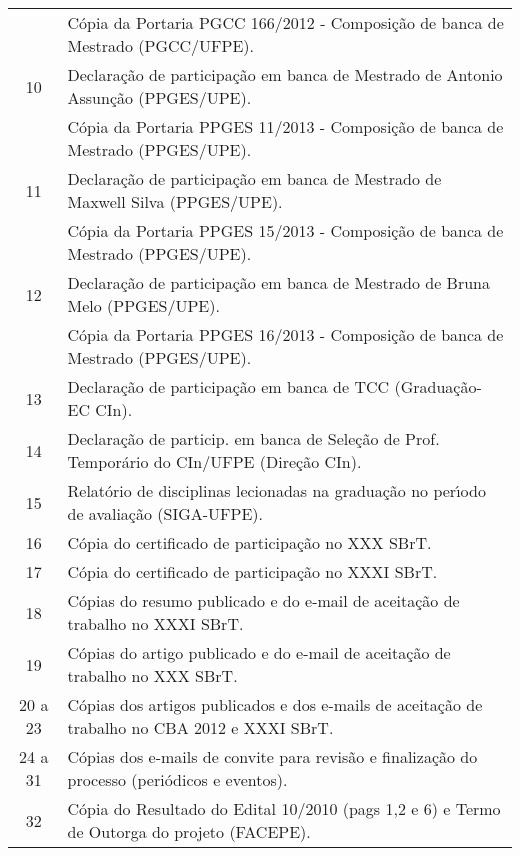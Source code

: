 \documentclass[a4paper,oneside,10pt]{article}
\begin{document}
\begin{table}[h]
\begin{tabular}{cl}
    & C\'{o}pia da Portaria PGCC 166/2012 - Composi\c{c}\~{a}o de banca de Mestrado (PGCC/UFPE). \\
  \cmidrule{1-2}
  10 & Declara\c{c}\~{a}o de participa\c{c}\~{a}o em banca de Mestrado de Antonio Assun\c{c}\~{a}o (PPGES/UPE). \\
     & C\'{o}pia da Portaria PPGES 11/2013 - Composi\c{c}\~{a}o de banca de Mestrado (PPGES/UPE). \\
  \cmidrule{1-2}
  11 & Declara\c{c}\~{a}o de participa\c{c}\~{a}o em banca de Mestrado de Maxwell Silva (PPGES/UPE). \\
     & C\'{o}pia da Portaria PPGES 15/2013 - Composi\c{c}\~{a}o de banca de Mestrado (PPGES/UPE). \\
  \cmidrule{1-2}
  12 & Declara\c{c}\~{a}o de participa\c{c}\~{a}o em banca de Mestrado de Bruna Melo (PPGES/UPE). \\
     & C\'{o}pia da Portaria PPGES 16/2013 - Composi\c{c}\~{a}o de banca de Mestrado (PPGES/UPE). \\
  \cmidrule{1-2}
  13 & Declara\c{c}\~{a}o de participa\c{c}\~{a}o em banca de TCC (Gradua\c{c}\~{a}o-EC CIn). \\
  14 & Declara\c{c}\~{a}o de particip. em banca de Sele\c{c}\~{a}o de Prof. Tempor\'{a}rio do CIn/UFPE (Dire\c{c}\~{a}o CIn). \\
  15 & Relat\'{o}rio de disciplinas lecionadas na gradua\c{c}\~{a}o no per\'{\i}odo de avalia\c{c}\~{a}o (SIGA-UFPE).\\
  16 & C\'{o}pia do certificado de participa\c{c}\~{a}o no XXX SBrT. \\
  17 & C\'{o}pia do certificado de participa\c{c}\~{a}o no XXXI SBrT. \\
  18 & C\'{o}pias do resumo publicado e do e-mail de aceita\c{c}\~{a}o de trabalho no XXXI SBrT. \\
  19 & C\'{o}pias do artigo publicado e do e-mail de aceita\c{c}\~{a}o de trabalho no XXX SBrT. \\
  20 a 23 & C\'{o}pias dos artigos publicados e dos e-mails de aceita\c{c}\~{a}o de trabalho no CBA 2012 e XXXI SBrT. \\
  24 a 31 & C\'{o}pias dos e-mails de convite para revis\~{a}o e finaliza\c{c}\~{a}o do processo (peri\'{o}dicos e eventos). \\
  \cmidrule{1-2}
  32 & C\'{o}pia do Resultado do Edital 10/2010 (pags 1,2 e 6) e Termo de Outorga do projeto (FACEPE). \\

\end{tabular}
\end{table}
\end{document}
